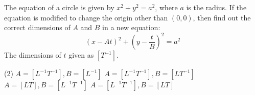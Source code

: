 \item The equation of a circle is given by \( x^2 + y^2 = a^2 \), where \( a \) is the radius. If the equation is modified to change the origin other than \( (0,0) \), then find out the correct dimensions of \( A \) and \( B \) in a new equation:
\[
(x - At)^2 + \left( y - \frac{t}{B} \right)^2 = a^2
\]
The dimensions of \( t \) given as \( [T^{-1}] \).

\begin{tasks}(2)
    \task \( A = [L^{-1}T^{-1}], B = [L^{-1}] \)
    \task \( A = [L^{-1}T^{-1}], B = [LT^{-1}] \)
    \task \( A = [LT], B = [L^{-1}T^{-1}] \)
    \task \( A = [L^{-1}T^{-1}], B = [LT] \)
\end{tasks}